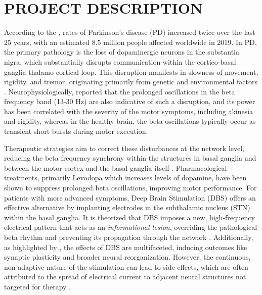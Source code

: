 \documentclass[12pt, a4paper]{article}
\begin{document}
\section{PROJECT DESCRIPTION}

According to the \textcite{who_parkinson_2023}, rates of Parkinson's disease (PD) increased twice over the last 25 years, with an estimated 8.5 million people affected worldwide in 2019. In PD, the primary pathology is the loss of dopaminergic neurons in the substantia nigra, which substantially disrupts communication within the cortico-basal ganglia-thalamo-cortical loop. This disruption manifests in slowness of movement, rigidity, and tremor, originating primarily from genetic and environmental factors \parencite{ben-shlomoEpidemiologyParkinsonsDisease2024}. Neurophysiologically, \textcite{tinkhauserBetaBurstDynamics2017} reported that the prolonged oscillations in the beta frequency band (13-30 Hz) are also indicative of such a disruption, and its power has been correlated with the severity of the motor symptoms, including akinesia and rigidity, whereas in the healthy brain, the beta oscillations typically occur as transient short bursts during motor execution.


Therapeutic strategies aim to correct these disturbances at the network level, reducing the beta frequency synchrony within the structures in basal ganglia and between the motor cortex and the basal ganglia itself \parencite{tinkhauserBetaBurstDynamics2017, paulsCorticalBetaBurst2022}. Pharmacological treatments, primarily Levodopa which increases levels of dopamine, have been shown to suppress prolonged beta oscillations, improving motor performance. For patients with more advanced symptoms, Deep Brain Stimulation (DBS) offers an effective alternative by implanting electrodes in the subthalamic nucleus (STN) within the basal ganglia. It is theorized that DBS imposes a new, high-frequency electrical pattern that acts as an \textit{informational lesion}, overriding the pathological beta rhythm and preventing its propagation through the network \parencite{chikenMechanismDeepBrain2016,mcintyreNetworkPerspectivesMechanisms2010}. Additionally, as highlighted by \textcite{wuComputationalModelsAdvance2024}, the effects of DBS are multifaceted, inducing outcomes like synaptic plasticity and broader neural reorganization. However, the continuous, non-adaptive nature of the stimulation can lead to side effects, which are often attributed to the spread of electrical current to adjacent neural structures not targeted for therapy \parencite{zarzyckiStimulationinducedSideEffects2020}.
\end{document}
